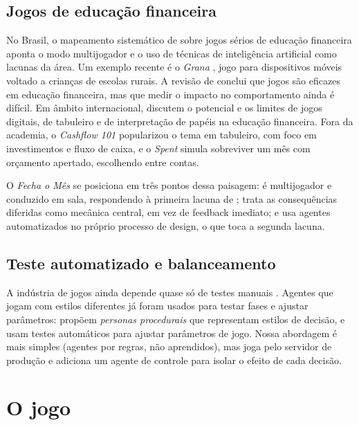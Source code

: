 \documentclass[11pt,a4paper]{article}
\begin{document}
\subsection{Jogos de educação financeira}

No Brasil, o mapeamento sistemático de \citet{torrens2021} sobre jogos sérios de educação financeira aponta o modo multijogador e o uso de técnicas de inteligência artificial como lacunas da área. Um exemplo recente é o \emph{Grana} \cite{cavalcante2021}, jogo para dispositivos móveis voltado a crianças de escolas rurais. A revisão de \citet{andrade2025} conclui que jogos são eficazes em educação financeira, mas que medir o impacto no comportamento ainda é difícil. Em âmbito internacional, \citet{kalmi2021} discutem o potencial e os limites de jogos digitais, de tabuleiro e de interpretação de papéis na educação financeira. Fora da academia, o \emph{Cashflow 101} \cite{cashflow1996} popularizou o tema em tabuleiro, com foco em investimentos e fluxo de caixa, e o \emph{Spent} \cite{spent2011} simula sobreviver um mês com orçamento apertado, escolhendo entre contas. %

O \emph{Fecha o Mês} se posiciona em três pontos dessa paisagem: é multijogador e conduzido em sala, respondendo à primeira lacuna de \citet{torrens2021}; trata as consequências diferidas como mecânica central, em vez de feedback imediato; e usa agentes automatizados no próprio processo de design, o que toca a segunda lacuna.

\subsection{Teste automatizado e balanceamento}

A indústria de jogos ainda depende quase só de testes manuais \cite{politowski2021}. Agentes que jogam com estilos diferentes já foram usados para testar fases e ajustar parâmetros: \citet{holmgard2019} propõem \emph{personas procedurais} que representam estilos de decisão, e \citet{zook2014} usam testes automáticos para ajustar parâmetros de jogo. Nossa abordagem é mais simples (agentes por regras, não aprendidos), mas joga pelo servidor de produção e adiciona um agente de controle para isolar o efeito de cada decisão.

\section{O jogo}
\end{document}

